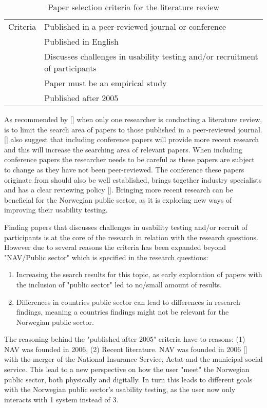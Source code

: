 \begin{table}[H]
\centering
\begin{tabular}{l|l}
Criteria          & Published in a peer-reviewed journal or conference   \\
\multirow{4}{*}{} & Published in English \\
                  & Discusses challenges in usability testing and/or recruitment of participants \\
                  & Paper must be an empirical study \\
                  & Published after 2005 \\
\end{tabular}
\caption{Paper selection criteria for the literature review}
\label{tab:paper-selection}
\end{table}

As recommended by [\cite{bjo_2012}] when only one researcher is conducting a literature review, is to limit the search area of papers to those published in a peer-reviewed journal. [\cite{bjo_2012}] also suggest that including conference papers will provide more recent research and this will increase the searching area of relevant papers. When including conference papers the researcher needs to be careful as these papers are subject to change as they have not been peer-reviewed. The conference these papers originate from should also be well established, brings together industry specialists and has a clear reviewing policy [\cite{bjo_2012}]. Bringing more recent research can be beneficial for the Norwegian public sector, as it is exploring new ways of improving their usability testing.

Finding papers that discusses challenges in usability testing and/or recruit of participants is at the core of the research in relation with the research questions. However due to several reasons the criteria has been expanded beyond "NAV/Public sector" which is specified in the research questions:
\begin{enumerate}
    \item Increasing the search results for this topic, as early exploration of papers with the inclusion of "public sector" led to no/small amount of results.
    \item Differences in countries public sector can lead to differences in research findings, meaning a countries findings might not be relevant for the Norwegian public sector. 
\end{enumerate}

The reasoning behind the "published after 2005" criteria have to reasons: (1) NAV was founded in 2006, (2) Recent literature. NAV was founded in 2006 [\cite{nav_2022}] with the merger of the National Insurance Service, Aetat and the municipal social service. This lead to a new perspective on how the user "meet" the Norwegian public sector, both physically and digitally. In turn this leads to different goals with the Norwegian public sector's usability testing, as the user now only interacts with 1 system instead of 3.

